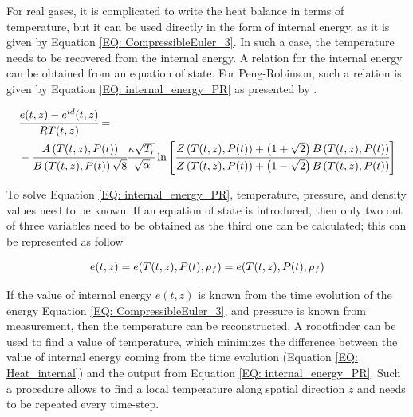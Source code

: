 \documentclass[../Article_Model_Parameters.tex]{subfiles}
\begin{document}
			For real gases, it is complicated to write the heat balance in terms of temperature, but it can be used directly in the form of internal energy, as it is given by Equation \ref{EQ: CompressibleEuler_3}. In such a case, the temperature needs to be recovered from the internal energy. A relation for the internal energy can be obtained from an equation of state. For Peng-Robinson, such a relation is given by Equation \ref{EQ: internal_energy_PR} as presented by \citet{Elliott2011}.
			
		
			{\scriptsize
				\begin{equation}
					\begin{aligned}
					&\cfrac{e(t,z)-e^{id}(t,z)}{RT(t,z)} = \\
					& - \cfrac{{\color{black}A}\left(T(t,z), {\color{black}P}(t)\right)}{{\color{black}B}\left(T(t,z), {\color{black}P}(t)\right)\sqrt{8}} \cfrac{{\color{black}\kappa} \sqrt{\color{black}T_r}}{\sqrt{\alpha}} \ln \left[ \cfrac{{\color{black}Z}\left(T(t,z), {\color{black}P}(t)\right)+\left( 1+\sqrt{2} \right){\color{black}B}\left(T(t,z), {\color{black}P}(t)\right)}{{\color{black}Z}\left(T(t,z), {\color{black}P}(t)\right)+\left( 1-\sqrt{2} \right){\color{black}B}\left(T(t,z), {\color{black}P}(t)\right)} \right]
					\label{EQ: internal_energy_PR}
				\end{aligned}
			\end{equation}
			}
			
			To solve Equation \ref{EQ: internal_energy_PR}, temperature, pressure, and density values need to be known. If an equation of state is introduced, then only two out of three variables need to be obtained as the third one can be calculated; this can be represented as follow
			
			{\footnotesize
			\begin{equation}
				e(t,z)=e(T(t,z),{\color{black}P}(t),\rho_f)=e( T(t,z),{\color{black}P}(t), \rho_f ) 
			\end{equation}
			}
		
			If the value of internal energy $e(t,z)$ is known from the time evolution of the energy Equation \ref{EQ: CompressibleEuler_3}, and pressure is known from measurement, then the temperature can be reconstructed. A roootfinder can be used to find a value of temperature, which minimizes the difference between the value of internal energy coming from the time evolution (Equation \ref{EQ: Heat_internal}) and the output from Equation \ref{EQ: internal_energy_PR}. Such a procedure allows to find a local temperature along spatial direction $z$ and needs to be repeated every time-step.
		
\end{document}
